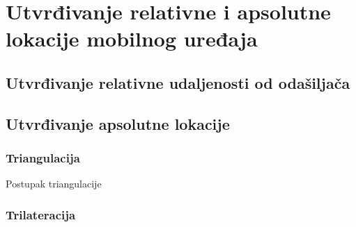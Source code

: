 \chapter{Utvrđivanje relativne i apsolutne lokacije mobilnog uređaja}

\section*{Utvrđivanje relativne udaljenosti od odašiljača}

\section*{Utvrđivanje apsolutne lokacije}

\subsection*{Triangulacija}

Postupak triangulacije

\subsection*{Trilateracija}
